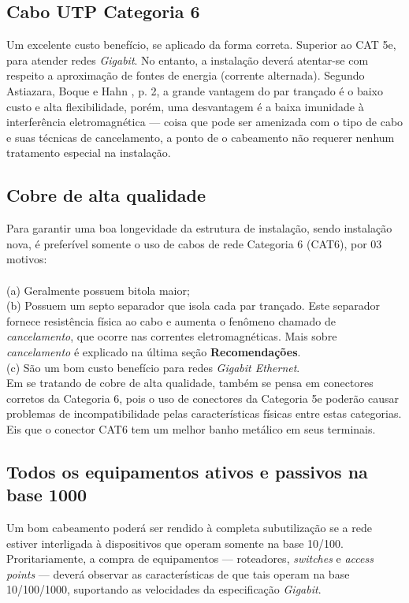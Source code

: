 \documentclass[	DIV=calc,%
							paper=a4,%
							fontsize=12pt,%
							onecolumn]{scrartcl}	 					%
\begin{document}
\subsection{Cabo UTP Categoria 6}
Um excelente custo benefício, se aplicado da forma correta. Superior ao CAT 5e, para atender redes \textit{Gigabit}. No entanto, a instalação deverá atentar-se com respeito a aproximação de fontes de energia (corrente alternada). Segundo Astiazara, Boque e Hahn \cite{utp}, p. 2, a grande vantagem do par trançado é o  baixo custo e alta flexibilidade, porém, uma desvantagem é a baixa imunidade à interferência eletromagnética --- coisa que pode ser amenizada com o tipo de cabo e suas técnicas de cancelamento, a ponto de o cabeamento não requerer nenhum tratamento especial na instalação. 

\subsection{Cobre de alta qualidade}
Para garantir uma boa longevidade da estrutura de instalação, sendo instalação nova, é preferível somente o uso de cabos de rede Categoria 6 (CAT6), por 03 motivos: \\ \\
(a) Geralmente possuem bitola maior;\\
(b) Possuem um septo separador que isola cada par trançado. Este separador fornece resistência física ao cabo e aumenta o fenômeno chamado de \textit{cancelamento}, que ocorre nas correntes eletromagnéticas. Mais sobre \textit{cancelamento} é explicado na última seção \textbf{Recomendações}.\\
(c) São um bom custo benefício para redes \textit{Gigabit Ethernet}.\\

Em se tratando de cobre de alta qualidade, também se pensa em conectores corretos da Categoria 6, pois o uso de conectores da Categoria 5e poderão causar problemas de incompatibilidade pelas características físicas entre estas categorias. Eis que o conector CAT6 tem um melhor banho metálico em seus terminais.

\subsection{Todos os equipamentos ativos e passivos na base 1000}
Um bom cabeamento poderá ser rendido à completa subutilização se a rede estiver interligada à dispositivos que operam somente na base 10/100. Proritariamente, a compra de equipamentos --- roteadores, \textit{switches} e \textit{access points} --- deverá observar as características de que tais operam na base 10/100/1000, suportando as velocidades da especificação \textit{Gigabit}.
\end{document}
